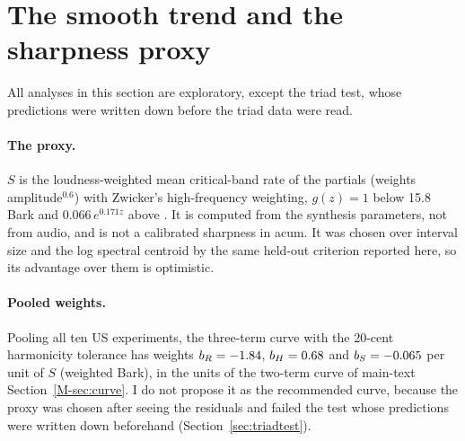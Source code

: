 \documentclass[11pt,a4paper]{article}
\begin{document}
\begin{table}[h]
\centering
\caption{Korean experiments predicted with weights from US listeners (exploratory): held-out
$R^2$ [participant-bootstrap CI], and the split-half ceiling.}
\label{tab:korean}
\footnotesize
\setlength{\tabcolsep}{3pt}
\end{table}

\section{The smooth trend and the sharpness proxy}
\label{sec:sharpness}
All analyses in this section are exploratory, except the triad test, whose predictions were
written down before the triad data were read.

\paragraph{The proxy.}
$S$ is the loudness-weighted mean critical-band rate of the partials (weights
amplitude$^{0.6}$) with Zwicker's high-frequency weighting, $g(z)=1$ below 15.8\,Bark and
$0.066\,e^{0.171z}$ above \citep{zwicker2007}. It is computed from the synthesis parameters, not
from audio, and is not a calibrated sharpness in acum. It was chosen over interval size and
the log spectral centroid by the same held-out criterion reported here, so its advantage over
them is optimistic.

\paragraph{Pooled weights.}
Pooling all ten US experiments, the three-term curve with the 20-cent harmonicity tolerance
has weights $b_R=-{}1.84$, $b_H=0.68$ and $b_S=-{}0.065$ per unit of $S$ (weighted Bark),
in the units of the two-term curve of main-text Section~\ref{M-sec:curve}. I do not
propose it as the recommended curve, because the proxy was chosen after seeing the residuals
and failed the test whose predictions were written down beforehand (Section~\ref{sec:triadtest}).
\end{document}
